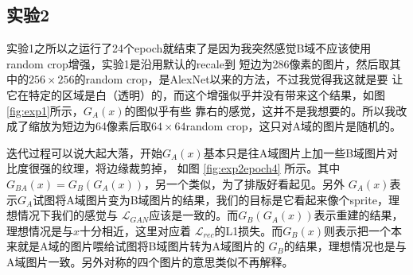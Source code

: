 \documentclass[twocolumn,11pt]{ctexart}
\begin{document}
\subsection{实验2}

实验1之所以之运行了24个epoch就结束了是因为我突然感觉B域不应该使用random crop增强，实验1是沿用默认的recale到
短边为286像素的图片，然后取其中的$256 \times 256$的random crop，是AlexNet以来的方法，不过我觉得我这就是要
让它在特定的区域是白（透明）的，而这个增强似乎并没有带来这个结果，如图\ref{fig:exp1}所示，$G_A(x)$的图似乎有些
靠右的感觉，这并不是我想要的。所以我改成了缩放为短边为64像素后取$64 \times 64$random crop，这只对A域的图片是随机的。

迭代过程可以说大起大落，开始$G_A(x)$基本只是往A域图片上加一些B域图片对比度很强的纹理，将边缘裁剪掉，
如图 \ref{fig:exp2epoch4} 所示。其中$G_{BA}(x)=G_B(G_A(x))$，另一个类似，为了排版好看起见。另外
$G_A(x)$表示$G_A$试图将A域图片变为B域图片的结果，我们的目标是它看起来像个sprite，理想情况下我们的感觉与
$\mathcal{L}_{GAN}$应该是一致的。而$G_B(G_A(x))$表示重建的结果，理想情况是与$x$十分相近，这里对应着
$\mathcal{L}_{rec}$的L1损失。而$G_B(x)$则表示把一个本来就是A域的图片喂给试图将B域图片转为A域图片的
$G_B$的结果，理想情况也是与A域图片一致。另外对称的四个图片的意思类似不再解释。
\end{document}
